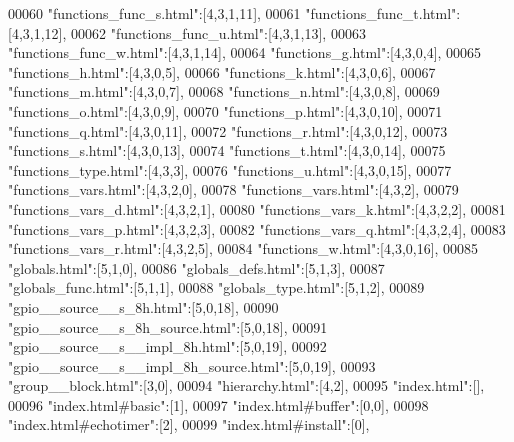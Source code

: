 \begin{DoxyCode}
00060 \textcolor{stringliteral}{"functions\_func\_s.html"}:[4,3,1,11],
00061 \textcolor{stringliteral}{"functions\_func\_t.html"}:[4,3,1,12],
00062 \textcolor{stringliteral}{"functions\_func\_u.html"}:[4,3,1,13],
00063 \textcolor{stringliteral}{"functions\_func\_w.html"}:[4,3,1,14],
00064 \textcolor{stringliteral}{"functions\_g.html"}:[4,3,0,4],
00065 \textcolor{stringliteral}{"functions\_h.html"}:[4,3,0,5],
00066 \textcolor{stringliteral}{"functions\_k.html"}:[4,3,0,6],
00067 \textcolor{stringliteral}{"functions\_m.html"}:[4,3,0,7],
00068 \textcolor{stringliteral}{"functions\_n.html"}:[4,3,0,8],
00069 \textcolor{stringliteral}{"functions\_o.html"}:[4,3,0,9],
00070 \textcolor{stringliteral}{"functions\_p.html"}:[4,3,0,10],
00071 \textcolor{stringliteral}{"functions\_q.html"}:[4,3,0,11],
00072 \textcolor{stringliteral}{"functions\_r.html"}:[4,3,0,12],
00073 \textcolor{stringliteral}{"functions\_s.html"}:[4,3,0,13],
00074 \textcolor{stringliteral}{"functions\_t.html"}:[4,3,0,14],
00075 \textcolor{stringliteral}{"functions\_type.html"}:[4,3,3],
00076 \textcolor{stringliteral}{"functions\_u.html"}:[4,3,0,15],
00077 \textcolor{stringliteral}{"functions\_vars.html"}:[4,3,2,0],
00078 \textcolor{stringliteral}{"functions\_vars.html"}:[4,3,2],
00079 \textcolor{stringliteral}{"functions\_vars\_d.html"}:[4,3,2,1],
00080 \textcolor{stringliteral}{"functions\_vars\_k.html"}:[4,3,2,2],
00081 \textcolor{stringliteral}{"functions\_vars\_p.html"}:[4,3,2,3],
00082 \textcolor{stringliteral}{"functions\_vars\_q.html"}:[4,3,2,4],
00083 \textcolor{stringliteral}{"functions\_vars\_r.html"}:[4,3,2,5],
00084 \textcolor{stringliteral}{"functions\_w.html"}:[4,3,0,16],
00085 \textcolor{stringliteral}{"globals.html"}:[5,1,0],
00086 \textcolor{stringliteral}{"globals\_defs.html"}:[5,1,3],
00087 \textcolor{stringliteral}{"globals\_func.html"}:[5,1,1],
00088 \textcolor{stringliteral}{"globals\_type.html"}:[5,1,2],
00089 \textcolor{stringliteral}{"gpio\_\_source\_\_s\_8h.html"}:[5,0,18],
00090 \textcolor{stringliteral}{"gpio\_\_source\_\_s\_8h\_source.html"}:[5,0,18],
00091 \textcolor{stringliteral}{"gpio\_\_source\_\_s\_\_impl\_8h.html"}:[5,0,19],
00092 \textcolor{stringliteral}{"gpio\_\_source\_\_s\_\_impl\_8h\_source.html"}:[5,0,19],
00093 \textcolor{stringliteral}{"group\_\_block.html"}:[3,0],
00094 \textcolor{stringliteral}{"hierarchy.html"}:[4,2],
00095 \textcolor{stringliteral}{"index.html"}:[],
00096 \textcolor{stringliteral}{"index.html#basic"}:[1],
00097 \textcolor{stringliteral}{"index.html#buffer"}:[0,0],
00098 \textcolor{stringliteral}{"index.html#echotimer"}:[2],
00099 \textcolor{stringliteral}{"index.html#install"}:[0],

\end{DoxyCode}
